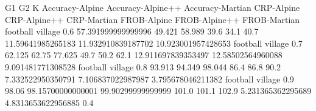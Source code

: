 G1 G2 K Accuracy-Alpine Accuracy-Alpine++ Accuracy-Martian CRP-Alpine CRP-Alpine++ CRP-Martian FROB-Alpine FROB-Alpine++ FROB-Martian
football village 0.6 57.391999999999996 49.421 58.989 39.6 34.1 40.7 11.59641985265183 11.932910839187702 10.923001957428653
football village 0.7 62.125 62.75 77.625 49.7 50.2 62.1 12.911697839353497 12.58502564960088 9.091481771308528
football village 0.8 93.913 94.349 98.044 86.4 86.8 90.2 7.332522950350791 7.106837022987987 3.795678046211382
football village 0.9 98.06 98.15700000000001 99.90299999999999 101.0 101.1 102.9 5.231365362295689 4.8313653622956885 0.4
